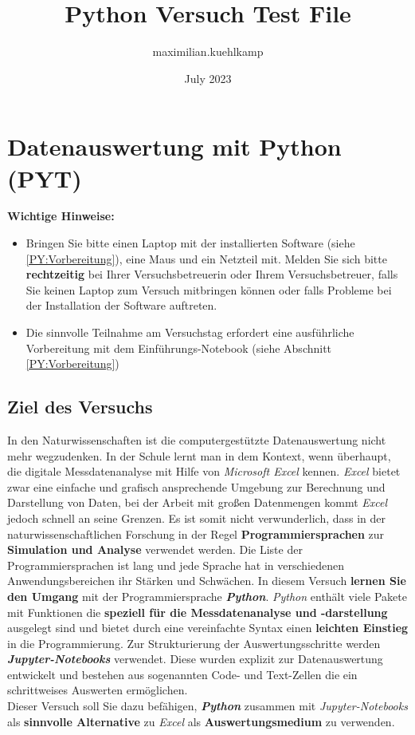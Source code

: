 \documentclass[12pt]{scrbook}
\title{Python Versuch Test File}
\author{maximilian.kuehlkamp }
\date{July 2023}
\begin{document}
\chapter{Datenauswertung mit Python (PYT)}

\textbf{Wichtige Hinweise:} 
\begin{itemize}
    \item Bringen Sie bitte einen Laptop mit der installierten Software (siehe \autoref{PY:Vorbereitung}), eine Maus und ein Netzteil mit. Melden Sie sich bitte \textbf{rechtzeitig} bei Ihrer Versuchsbetreuerin oder Ihrem Versuchsbetreuer, falls Sie keinen Laptop zum Versuch mitbringen können oder falls Probleme bei der Installation der Software auftreten.
    \item Die sinnvolle Teilnahme am Versuchstag erfordert eine ausführliche Vorbereitung mit dem Einführungs-Notebook (siehe Abschnitt \ref{PY:Vorbereitung})
\end{itemize}


\section{Ziel des Versuchs}

In den Naturwissenschaften ist die computergestützte Datenauswertung nicht mehr wegzudenken. In der Schule lernt man in dem Kontext, wenn überhaupt, die digitale Messdatenanalyse mit Hilfe von \textit{Microsoft Excel} kennen. \textit{Excel} bietet zwar eine einfache und grafisch ansprechende Umgebung zur Berechnung und Darstellung von Daten, bei der Arbeit mit großen Datenmengen kommt \textit{Excel} jedoch schnell an seine Grenzen. Es ist somit nicht verwunderlich, dass in der naturwissenschaftlichen Forschung in der Regel \textbf{Programmiersprachen} zur \textbf{Simulation und Analyse} verwendet werden. Die Liste der Programmiersprachen ist lang und jede Sprache hat in verschiedenen Anwendungsbereichen ihr Stärken und Schwächen. In diesem Versuch \textbf{lernen Sie den Umgang}  mit der Programmiersprache \textbf{\textit{Python}}. \textit{Python} enthält viele Pakete mit Funktionen die \textbf{speziell für die Messdatenanalyse und -darstellung} ausgelegt sind und bietet durch eine vereinfachte Syntax einen \textbf{leichten Einstieg} in die Programmierung. Zur Strukturierung der Auswertungsschritte werden \textbf{\textit{Jupyter-Notebooks}} verwendet. Diese wurden explizit zur Datenauswertung entwickelt und bestehen aus sogenannten Code- und Text-Zellen die ein schrittweises Auswerten ermöglichen.\\
Dieser Versuch soll Sie dazu befähigen, \textbf{\textit{Python}} zusammen mit \textit{Jupyter-Notebooks} als \textbf{sinnvolle Alternative} zu \textit{Excel} als \textbf{Auswertungsmedium} zu verwenden.
\end{document}

